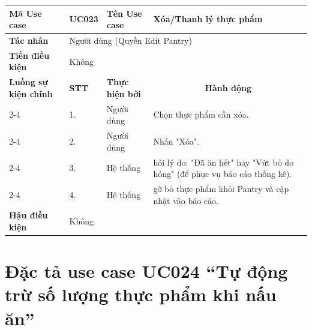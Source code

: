 \begin{longtable}{|p{2.7cm}|p{0.8cm}|p{2.6cm}|p{7.3cm}|}
\hline
\cellcolor[HTML]{D5F5E3}\textbf{Mã Use case} & \multicolumn{1}{l|}{UC023} & \cellcolor[HTML]{D5F5E3}\textbf{Tên Use case} & Xóa/Thanh lý thực phẩm \\ \hline
\cellcolor[HTML]{D5F5E3}\textbf{Tác nhân} & \multicolumn{3}{p{10.7cm}|}{Người dùng (Quyền Edit Pantry)} \\ \hline
\cellcolor[HTML]{D5F5E3}\textbf{Tiền điều kiện} & \multicolumn{3}{p{10.7cm}|}{Không} \\ \hline

\cellcolor[HTML]{D5F5E3}\textbf{Luồng sự kiện chính} & \cellcolor[HTML]{FDEBD0}\textbf{STT} & \cellcolor[HTML]{FDEBD0}\textbf{Thực hiện bởi} & \multicolumn{1}{c|}{\cellcolor[HTML]{FDEBD0}\textbf{Hành động}} \\ \cline{2-4} 
\cellcolor[HTML]{D5F5E3} & 1. & Người dùng & Chọn thực phẩm cần xóa. \\ \cline{2-4} 
\cellcolor[HTML]{D5F5E3} & 2. & Người dùng & Nhấn "Xóa". \\ \cline{2-4} 
\cellcolor[HTML]{D5F5E3} & 3. & Hệ thống & hỏi lý do: "Đã ăn hết" hay "Vứt bỏ do hỏng" (để phục vụ báo cáo thống kê). \\ \cline{2-4} 
\cellcolor[HTML]{D5F5E3} & 4. & Hệ thống & gỡ bỏ thực phẩm khỏi Pantry và cập nhật vào báo cáo. \\ \hline

\cellcolor[HTML]{D5F5E3}\textbf{Hậu điều kiện} & \multicolumn{3}{p{10.7cm}|}{Không} \\ \hline
\end{longtable}
\endgroup

\section{Đặc tả use case UC024 ``Tự động trừ số lượng thực phẩm khi nấu ăn''}
\vspace{0.5cm}

\begingroup
\renewcommand{\arraystretch}{1.5}

